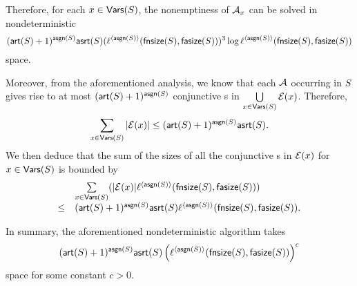 Therefore, for each $x \in \mathsf{Vars}(S)$, 
the nonemptiness of $\mathcal{A}_x$ can be solved in nondeterministic 
{\small
$$(\mathsf{art}(S)+1)^{\mathsf{asgn}(S)}\mathsf{asrt}(S)(\ell^{\langle \mathsf{asgn}(S) \rangle}(\mathsf{fnsize}(S), \mathsf{fasize}(S)))^3 \log \ell^{\langle \mathsf{asgn}(S) \rangle}(\mathsf{fnsize}(S), \mathsf{fasize}(S))$$
}
space.

Moreover, from the aforementioned analysis, we know that each \FA{} $\mathcal{A}$ occurring in $S$ gives rise to at most $(\mathsf{art}(S)+1)^{\mathsf{asgn}(S)}$ conjunctive \FA{}s in $\bigcup \limits_{x \in \mathsf{Vars}(S)} \mathcal{E}(x)$. Therefore, 
$$\sum \limits_{x \in \mathsf{Vars}(S)} |\mathcal{E}(x)| \le (\mathsf{art}(S)+1)^{\mathsf{asgn}(S)} \mathsf{asrt}(S).$$
We then deduce that the sum of the sizes of all the conjunctive \FA{}s in $\mathcal{E}(x)$ for $x \in \mathsf{Vars}(S)$ is bounded by 
$$
\begin{array}{l l}
& \sum \limits_{x \in \mathsf{Vars}(S)} (|\mathcal{E}(x)| \ell^{\langle \mathsf{asgn}(S) \rangle}(\mathsf{fnsize}(S), \mathsf{fasize}(S)))  \\
\le & (\mathsf{art}(S)+1)^{\mathsf{asgn}(S)}\mathsf{asrt}(S) \ell^{\langle \mathsf{asgn}(S) \rangle}(\mathsf{fnsize}(S), \mathsf{fasize}(S)) .
\end{array}
$$

In summary, the aforementioned nondeterministic algorithm takes 
$$(\mathsf{art}(S)+1)^{\mathsf{asgn}(S)}  \mathsf{asrt}(S) \left(\ell^{\langle \mathsf{asgn}(S) \rangle}(\mathsf{fnsize}(S), \mathsf{fasize}(S)) \right)^c$$
 space for some constant $c > 0$.
